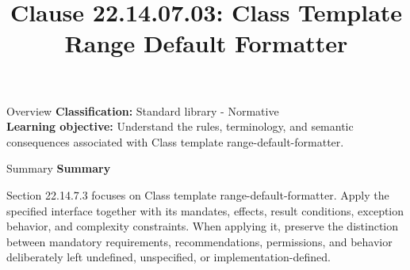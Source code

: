 \documentclass[10pt,letterpaper]{article}
\title{Clause 22.14.07.03: Class Template Range Default Formatter}
\author{}
\date{}
\begin{document}
\maketitle
\begin{CornellOverviewBox}{Overview}
\textbf{Classification:} Standard library - Normative\\[2pt]
\textbf{Learning objective:} Understand the rules, terminology, and semantic consequences associated with Class template range-default-formatter.
\end{CornellOverviewBox}\begin{CornellSummaryBox}{Summary}
{\sffamily\bfseries\color{Accent} Summary}\par\vspace{3pt}Section 22.14.7.3 focuses on Class template range-default-formatter. Apply the specified interface together with its mandates, effects, result conditions, exception behavior, and complexity constraints. When applying it, preserve the distinction between mandatory requirements, recommendations, permissions, and behavior deliberately left undefined, unspecified, or implementation-defined.
\end{CornellSummaryBox}
\end{document}
